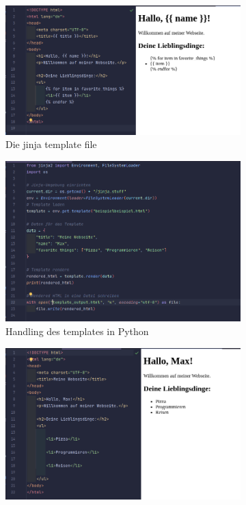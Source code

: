 \documentclass[a4paper, 12pt]{article}
\begin{document}
\begin{figure}[H]
	\hspace*{-2cm}
    \begin{subfigure}{0.6\textwidth}
        \includegraphics[width=\linewidth]{jinja_template.png}
        \caption{Die jinja template file}
        \label{fig:jinja_template}
    \end{subfigure}
	\hspace*{1.5cm}
    \begin{subfigure}{0.55\textwidth}
        \includegraphics[width=\linewidth]{jinja_python_code.png}
        \caption{Handling des templates in Python}
        \label{fig:jinja_python_code}
    \end{subfigure}
	\hspace*{3.5cm}
    \begin{subfigure}{0.6\textwidth}
        \includegraphics[width=\linewidth]{jinja_fertige_html_file.png}

\end{subfigure}
\end{figure}
\end{document}

